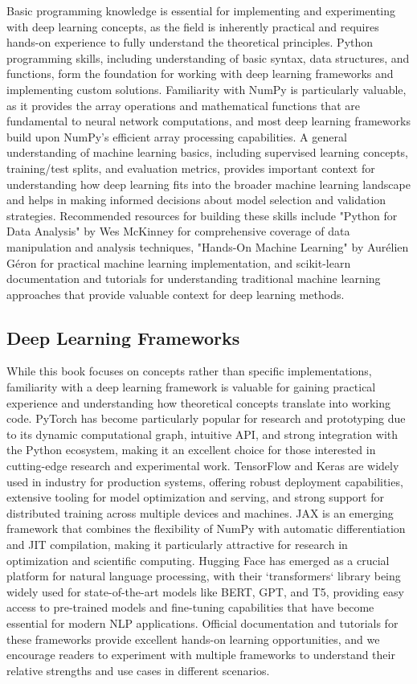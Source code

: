 Basic programming knowledge is essential for implementing and experimenting with deep learning concepts, as the field is inherently practical and requires hands-on experience to fully understand the theoretical principles. Python programming skills, including understanding of basic syntax, data structures, and functions, form the foundation for working with deep learning frameworks and implementing custom solutions. Familiarity with NumPy is particularly valuable, as it provides the array operations and mathematical functions that are fundamental to neural network computations, and most deep learning frameworks build upon NumPy's efficient array processing capabilities. A general understanding of machine learning basics, including supervised learning concepts, training/test splits, and evaluation metrics, provides important context for understanding how deep learning fits into the broader machine learning landscape and helps in making informed decisions about model selection and validation strategies. Recommended resources for building these skills include "Python for Data Analysis" by Wes McKinney for comprehensive coverage of data manipulation and analysis techniques, "Hands-On Machine Learning" by Aurélien Géron for practical machine learning implementation, and scikit-learn documentation and tutorials for understanding traditional machine learning approaches that provide valuable context for deep learning methods.

\subsection{Deep Learning Frameworks}

While this book focuses on concepts rather than specific implementations, familiarity with a deep learning framework is valuable for gaining practical experience and understanding how theoretical concepts translate into working code. PyTorch has become particularly popular for research and prototyping due to its dynamic computational graph, intuitive API, and strong integration with the Python ecosystem, making it an excellent choice for those interested in cutting-edge research and experimental work. TensorFlow and Keras are widely used in industry for production systems, offering robust deployment capabilities, extensive tooling for model optimization and serving, and strong support for distributed training across multiple devices and machines. JAX is an emerging framework that combines the flexibility of NumPy with automatic differentiation and JIT compilation, making it particularly attractive for research in optimization and scientific computing. Hugging Face has emerged as a crucial platform for natural language processing, with their `transformers` library being widely used for state-of-the-art models like BERT, GPT, and T5, providing easy access to pre-trained models and fine-tuning capabilities that have become essential for modern NLP applications. Official documentation and tutorials for these frameworks provide excellent hands-on learning opportunities, and we encourage readers to experiment with multiple frameworks to understand their relative strengths and use cases in different scenarios.

